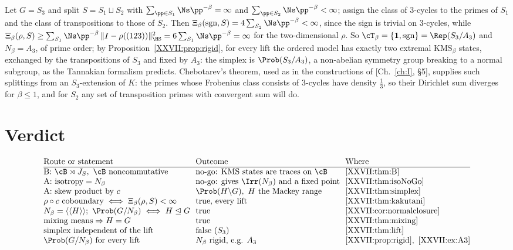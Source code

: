 \begin{example}\label{XXVII:ex:A3}
Let $G=S_3$ and split $S=S_1\sqcup S_2$ with $\sum_{\pp\in S_1}\Ns\pp^{-\beta}=\infty$ and
$\sum_{\pp\in S_2}\Ns\pp^{-\beta}<\infty$; assign the class of $3$-cycles to the primes of $S_1$
and the class of transpositions to those of $S_2$. Then
$\Xi_\beta(\mathrm{sgn},S)=4\sum_{S_2}\Ns\pp^{-\beta}<\infty$, since the sign is trivial on
$3$-cycles, while $\Xi_\beta(\rho,S)\ge\sum_{S_1}\Ns\pp^{-\beta}\,\|I-\rho((123))\|_{\HS}^2=6\sum_{S_1}\Ns\pp^{-\beta}=\infty$
for the two-dimensional $\rho$. So $\cT_\beta=\{\mathbf 1,\mathrm{sgn}\}=\Rep(S_3/A_3)$ and
$N_\beta=A_3$, of prime order; by Proposition~\ref{XXVII:prop:rigid}, for every lift the ordered
model has exactly two extremal $\mathrm{KMS}_\beta$ states, exchanged by the transpositions
of $S_3$ and fixed by $A_3$: the simplex is $\Prob(S_3/A_3)$, a non-abelian symmetry group
breaking to a normal subgroup, as the Tannakian formalism predicts. Chebotarev's theorem,
used as in the constructions of [Ch.~\ref{ch:I}, \S5], supplies such splittings from an
$S_3$-extension of $K$: the primes whose Frobenius class consists of $3$-cycles have density
$\frac13$, so their Dirichlet sum diverges for $\beta\le1$, and for $S_2$ any set of
transposition primes with convergent sum will do.
\end{example}

\section{Verdict}

\[
\begin{array}{@{}l@{\ \ }l@{\ \ }l@{}}
\text{Route or statement} & \text{Outcome} & \text{Where}\\\hline
\text{B: }\cB\rtimes J_S,\ \cB\text{ noncommutative} & \text{no-go: KMS states are traces on }\cB & \ref{XXVII:thm:B}\\
\text{A: isotropy}=N_\beta & \text{no-go: gives }\Irr(N_\beta)\text{ and a fixed point} & \ref{XXVII:thm:isoNoGo}\\
\text{A: skew product by }c & \Prob(H\backslash G),\ H\text{ the Mackey range} & \ref{XXVII:thm:simplex}\\
\rho\circ c\ \text{coboundary}\iff\Xi_\beta(\rho,S)<\infty & \text{true, every lift} & \ref{XXVII:thm:kakutani}\\
N_\beta=\langle\langle H\rangle\rangle;\ \Prob(G/N_\beta)\iff H\trianglelefteq G & \text{true} & \ref{XXVII:cor:normalclosure}\\
\text{mixing means}\Rightarrow H=G & \text{true} & \ref{XXVII:thm:mixing}\\
\text{simplex independent of the lift} & \text{false }(S_3) & \ref{XXVII:thm:lift}\\
\Prob(G/N_\beta)\ \text{for every lift} & N_\beta\text{ rigid, e.g. }A_3 & \ref{XXVII:prop:rigid},\ \ref{XXVII:ex:A3}
\end{array}
\]

